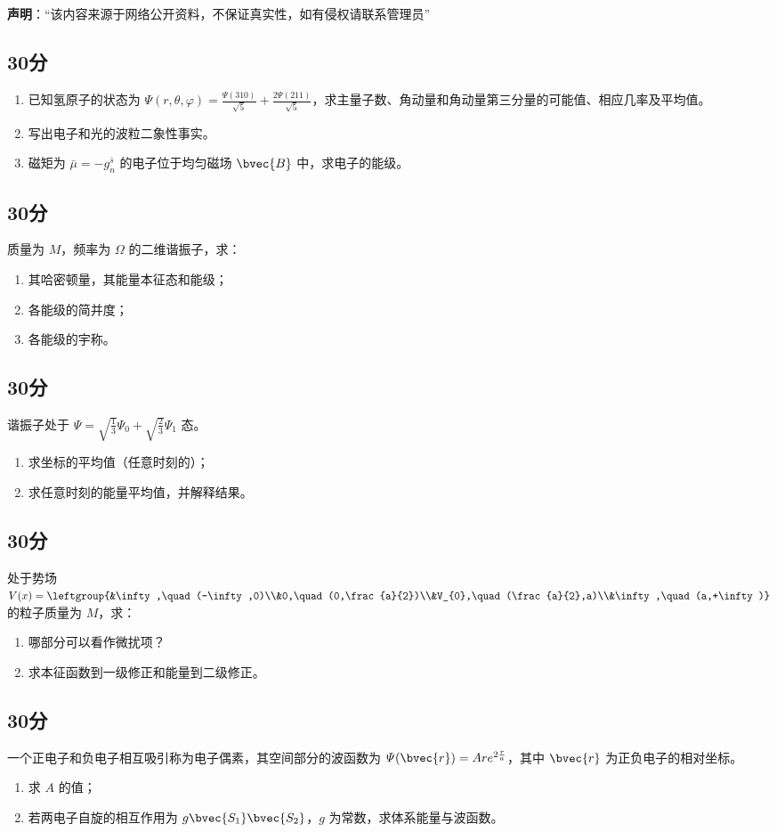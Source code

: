 
\textbf{声明}：“该内容来源于网络公开资料，不保证真实性，如有侵权请联系管理员”

\subsection{30分}
\begin{enumerate}
\item 已知氢原子的状态为 $\varPsi (r,\theta,\varphi)=\frac{\varPsi (310)}{\sqrt{5}}+\frac{2\varPsi (211)}{\sqrt{5}}$，求主量子数、角动量和角动量第三分量的可能值、相应几率及平均值。
\item 写出电子和光的波粒二象性事实。
\item 磁矩为 $\bar{\mu}=-g^{\bar{s}}_{n}$ 的电子位于均匀磁场 $\bvec{B}$ 中，求电子的能级。
\end{enumerate}
\subsection{30分}
质量为 $M$，频率为 $\Omega$ 的二维谐振子，求：
\begin{enumerate}
\item 其哈密顿量，其能量本征态和能级；
\item 各能级的简并度；
\item 各能级的宇称。
\end{enumerate}
\subsection{30分}
谐振子处于 $\varPsi =\sqrt{\frac{1}{3}}\varPsi_{0}+\sqrt{\frac{2}{3}}\varPsi_{1}$ 态。
\begin{enumerate}
\item 求坐标的平均值（任意时刻的）；
\item 求任意时刻的能量平均值，并解释结果。
\end{enumerate}
\subsection{30分}
处于势场 $V(x)=\leftgroup{&\infty,\quad (-\infty,0)\\&0,\quad (0,\frac{a}{2})\\&V_{0},\quad (\frac{a}{2},a)\\&\infty,\quad (a,+\infty)}$ 的粒子质量为 $M$，求：
\begin{enumerate}
\item 哪部分可以看作微扰项？
\item 求本征函数到一级修正和能量到二级修正。
\end{enumerate}
\subsection{30分}
一个正电子和负电子相互吸引称为电子偶素，其空间部分的波函数为 $\varPsi (\bvec{r})=Are^{2\frac{r}{a}}$，其中 $\bvec{r}$ 为正负电子的相对坐标。
\begin{enumerate}
\item 求 $A$ 的值；
\item 若两电子自旋的相互作用为 $g\bvec{S_{1}}\bvec{S_{2}}$，$g$ 为常数，求体系能量与波函数。
\end{enumerate}
